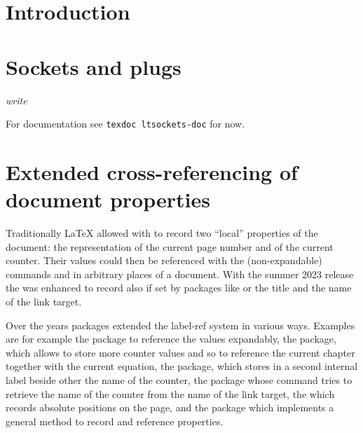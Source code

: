\documentclass{ltnews}
\providecommand\tubcommand[1]{}
\begin{document}
\tubcommand{\addtolength\textheight{4.2pc}}   %

\maketitle
{  \spaceskip=3.33pt 
\tableofcontents}

\setlength{}

\medskip

\section{Introduction}


\section{Sockets and plugs}

\emph{write}

For documentation see \texttt{texdoc ltsockets-doc} for now.

\section{Extended cross-referencing of document properties}

Traditionally \LaTeX{} allowed with  to record two \enquote{local} 
properties of the document: the representation of the current page number and 
of the current counter. Their values could then be referenced with the 
(non-expandable)  commands  and  in arbitrary places of a 
document.  With the summer 2023 release the  was enhanced to record 
also if set by packages like  or  the title and 
the name of the link target. 

Over the years packages extended the label-ref system in various ways. 
Examples are for example the  package to reference the values 
expandably, the  package, which allows to store more counter 
values and so to reference the current chapter together with the current 
equation, the  package, which stores in a second internal label 
beside other the name of the counter,  the  package whose 
 command tries to retrieve the name of the counter from the name 
of the link target, the  which records absolute positions on 
the page, and the  package which implements a general method to 
record and reference properties. 
\end{document}
